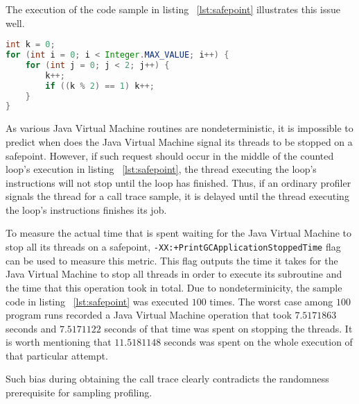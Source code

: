\documentclass[..thesis.tex]{subfiles}
\begin{document}
The execution of the code sample in listing ~\ref{lst:safepoint} illustrates this issue well. 
\begin{lstlisting}[language=java,style=def,label={lst:safepoint}, caption={Counted loops do not contain safepoints}]
int k = 0;
for (int i = 0; i < Integer.MAX_VALUE; i++) {
	for (int j = 0; j < 2; j++) {
    	k++;
    	if ((k % 2) == 1) k++;
	}
}
\end{lstlisting}
As various Java Virtual Machine routines are nondeterministic, it is impossible to predict when does the Java Virtual Machine signal its threads to be stopped on a safepoint. However, if such request should occur in the middle of the counted loop's execution in listing ~\ref{lst:safepoint}, the thread executing the loop's instructions will not stop until the loop has finished. Thus, if an ordinary profiler signals the thread for a call trace sample, it is delayed until the thread executing the loop's instructions finishes its job. 

To measure the actual time that is spent waiting for the Java Virtual Machine to stop all its threads on a safepoint, \texttt{-XX:+PrintGCApplicationStoppedTime} flag can be used to measure this metric. This flag outputs the time it takes for the Java Virtual Machine to stop all threads in order to execute its subroutine and the time that this operation took in total. Due to nondeterminicity, the sample code in listing ~\ref{lst:safepoint} was executed $100$ times. The worst case among $100$ program runs recorded a Java Virtual Machine operation that took $7.5171863$ seconds and $7.5171122$ seconds of that time was spent on stopping the threads. It is worth mentioning that $11.5181148$ seconds was spent on the whole execution of that particular attempt. 



Such bias during obtaining the call trace clearly contradicts the randomness prerequisite for sampling profiling. 
\end{document}
